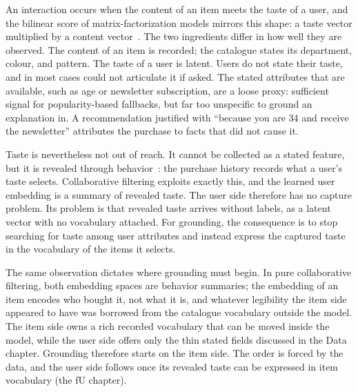 

An interaction occurs when the content of an item meets the taste of a
user, and the bilinear score of matrix-factorization models mirrors this
shape: a taste vector multiplied by a content vector~\cite{koren2009mf}.
The two ingredients differ in how well they are observed. The content of
an item is recorded; the catalogue states its department, colour, and
pattern. The taste of a user is latent. Users do not state their taste,
and in most cases could not articulate it if asked. The stated attributes
that are available, such as age or newsletter subscription, are a loose
proxy: sufficient signal for popularity-based fallbacks, but far too
unspecific to ground an explanation in. A recommendation justified with
``because you are 34 and receive the newsletter'' attributes the purchase
to facts that did not cause it.

Taste is nevertheless not out of reach. It cannot be collected as a
stated feature, but it is revealed through behavior~\cite{samuelson1948consumption}:
the purchase history records what a user's taste selects. Collaborative
filtering exploits exactly this, and the learned user embedding is a
summary of revealed taste. The user side therefore has no capture
problem. Its problem is that revealed taste arrives without labels, as a
latent vector with no vocabulary attached. For grounding, the consequence
is to stop searching for taste among user attributes and instead express
the captured taste in the vocabulary of the items it selects.

The same observation dictates where grounding must begin. In pure
collaborative filtering, both embedding spaces are behavior summaries;
the embedding of an item encodes who bought it, not what it is, and
whatever legibility the item side appeared to have was borrowed from the
catalogue vocabulary outside the model. The item side owns a rich
recorded vocabulary that can be moved inside the model, while the user
side offers only the thin stated fields discussed in
the Data chapter. Grounding therefore starts on the item side. The
order is forced by the data, and the user side follows once its revealed
taste can be expressed in item vocabulary (the fU chapter).
